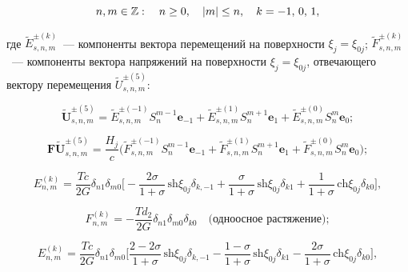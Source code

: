 \begin{equation}
n,m \in\mathbb{Z} :\quad n \ge 0,\quad |m| \le n,\quad k =  - 1,{\mkern 1mu} {\kern 1pt} 0,{\mkern 1mu} {\kern 1pt} 1,
\end{equation}

\noindent где $\tilde E_{s,n,m}^{\pm(k)}$~--- компоненты вектора перемещений на поверхности $\xi_j=\xi_{0j}$; $\tilde F_{s,n,m}^{\pm(k)}$~--- компоненты вектора напряжений на поверхности $\xi_j=\xi_{0j}$, отвечающего вектору перемещения $\tilde U_{s,n,m}^{\pm(5)}$:

$$
\mathbf{\tilde U}_{s,n,m}^{\pm(5)}=\tilde E_{s,n,m}^{\pm(-1)}S_n^{m-1}\mathbf{e}_{-1}+\tilde E_{s,n,m}^{\pm(1)}S_n^{m+1}\mathbf{e}_1+\tilde E_{s,n,m}^{\pm(0)}S_n^m\mathbf{e}_0;
$$

$$
\mathbf{F\tilde U}_{s,n,m}^{\pm(5)}=\frac{H_j}{c}\bigg(\tilde F_{s,n,m}^{\pm(-1)}S_n^{m-1}\mathbf{e}_{-1}+\tilde F_{s,n,m}^{\pm(1)}S_n^{m+1}\mathbf{e}_1+\tilde F_{s,n,m}^{\pm(0)}S_n^m\mathbf{e}_0\bigg);
$$

\begin{equation*}
E_{n,m}^{(k)} =\frac{Tc}{2G}\delta_{n1}\delta_{m0}\bigg[-\frac{2\sigma}{1+\sigma}\,\mathrm{sh}\xi_{0j}\delta_{k,-1}+\frac{\sigma}{1+\sigma}\,\mathrm{sh}\xi_{0j}\delta_{k1}+\frac{1}{1+\sigma}\,\mathrm{ch}\xi_{0j}\delta_{k0}\bigg],
\end{equation*}

\begin{equation*}
F_{n,m}^{(k)} =  -\frac{Td_2}{2G}{\delta _{n1}}{\delta _{m0}}{\delta _{k0}}\quad\text{(одноосное растяжение)};
\end{equation*}

\begin{equation*}
E_{n,m}^{(k)} =\frac{Tc}{2G}\delta_{n1}\delta_{m0}\bigg[\frac{2-2\sigma}{1+\sigma}\,\mathrm{sh}\xi_{0j}\delta_{k,-1}-\frac{1-\sigma}{1+\sigma}\,\mathrm{sh}\xi_{0j}\delta_{k1}-\frac{2\sigma}{1+\sigma}\,\mathrm{ch}\xi_{0j}\delta_{k0}\bigg],
\end{equation*}

